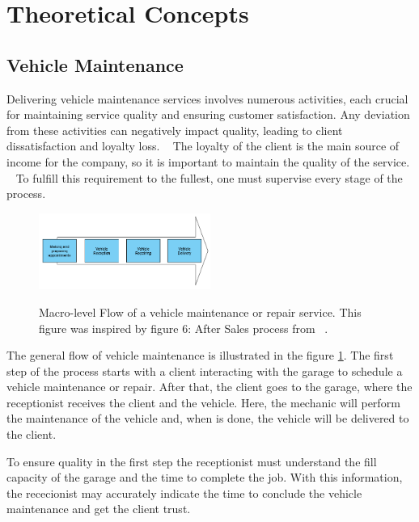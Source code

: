 \section{Theoretical Concepts}

\subsection{Vehicle Maintenance}

Delivering vehicle maintenance services involves numerous activities, each crucial for maintaining service quality and ensuring customer satisfaction. 
Any deviation from these activities can negatively impact quality, leading to client dissatisfaction and loyalty loss. ~\cite{Setting_the_after_sale_process}
The loyalty of the client is the main source of income for the company, so it is important to maintain the quality of the service. ~\cite{Setting_the_after_sale_process}
To fulfill this requirement to the fullest, one must supervise every stage of the process. ~\cite{Setting_the_after_sale_process}


\begin{figure}[h]
  \caption{Macro-level Flow of a vehicle maintenance or repair service. This figure was inspired by figure 6: After Sales process from ~\citet{Setting_the_after_sale_process}.}
  \centering
  \includegraphics[width=0.50\textwidth]{figs/Vehicle_maintenace_macro}
  \label{fig:Vehicle_maintenace_macro}
\end{figure}

The general flow of vehicle maintenance is illustrated in the figure \ref{fig:Vehicle_maintenace_macro}. 
The first step of the process starts with a client interacting with the garage to schedule a vehicle maintenance or repair. 
After that, the client goes to the garage, where the receptionist receives the client and the vehicle.
Here, the mechanic will perform the maintenance of the vehicle and, when is done, the vehicle will be delivered to the client.

To ensure quality in the first step the receptionist must understand the fill capacity of the garage and the time to complete the job. 
With this information, the rececionist may accurately indicate the time to conclude the vehicle maintenance and get the client trust. ~\cite{Setting_the_after_sale_process}

